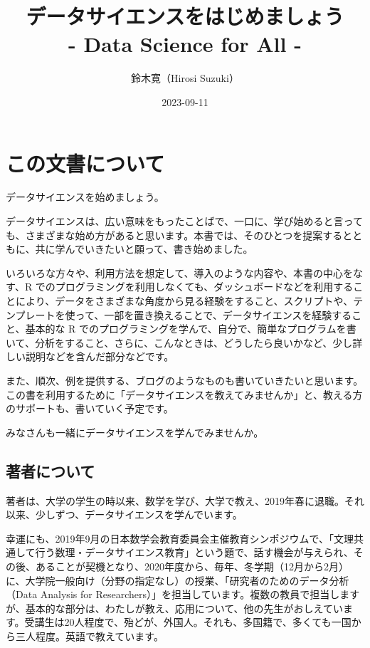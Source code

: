 \documentclass[
  xelatex, ja=standard]{bxjsbook}
\title{データサイエンスをはじめましょう\\
- Data Science for All -}
\author{鈴木寛（Hirosi Suzuki）}
\date{2023-09-11}
\theoremstyle{definition}
\theoremstyle{definition}
\theoremstyle{definition}
\theoremstyle{definition}
\theoremstyle{remark}
\begin{document}
\maketitle

{
\setcounter{tocdepth}{1}
\tableofcontents
}
\hypertarget{ux3053ux306eux6587ux66f8ux306bux3064ux3044ux3066}{%
\chapter*{この文書について}\label{ux3053ux306eux6587ux66f8ux306bux3064ux3044ux3066}}

データサイエンスを始めましょう。

データサイエンスは、広い意味をもったことばで、一口に、学び始めると言っても、さまざまな始め方があると思います。本書では、そのひとつを提案するとともに、共に学んでいきたいと願って、書き始めました。

いろいろな方々や、利用方法を想定して、導入のような内容や、本書の中心をなす、R でのプログラミングを利用しなくても、ダッシュボードなどを利用することにより、データをさまざまな角度から見る経験をすること、スクリプトや、テンプレートを使って、一部を置き換えることで、データサイエンスを経験すること、基本的な R でのプログラミングを学んで、自分で、簡単なプログラムを書いて、分析をすること、さらに、こんなときは、どうしたら良いかなど、少し詳しい説明などを含んだ部分などです。

また、順次、例を提供する、ブログのようなものも書いていきたいと思います。この書を利用するために「データサイエンスを教えてみませんか」と、教える方のサポートも、書いていく予定です。

みなさんも一緒にデータサイエンスを学んでみませんか。

\hypertarget{ux8457ux8005ux306bux3064ux3044ux3066}{%
\section*{著者について}\label{ux8457ux8005ux306bux3064ux3044ux3066}}

著者は、大学の学生の時以来、数学を学び、大学で教え、2019年春に退職。それ以来、少しずつ、データサイエンスを学んでいます。

幸運にも、2019年9月の日本数学会教育委員会主催教育シンポジウムで、「文理共通して行う数理・データサイエンス教育」という題で、話す機会が与えられ、その後、あることが契機となり、2020年度から、毎年、冬学期（12月から2月）に、大学院一般向け（分野の指定なし）の授業、「研究者のためのデータ分析（Data Analysis for Researchers）」を担当しています。複数の教員で担当しますが、基本的な部分は、わたしが教え、応用について、他の先生がおしえています。受講生は20人程度で、殆どが、外国人。それも、多国籍で、多くても一国から三人程度。英語で教えています。
\end{document}
